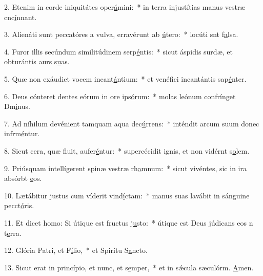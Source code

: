 2. Etenim in corde iniquitátes oper\uline{á}mini:~* in terra injustítias manus vestræ cnc\uline{í}nnant.\par 
3. Alienáti sunt peccatóres a vulva, erravérunt ab \uline{ú}tero:~* locúti snt f\uline{a}lsa.\par 
4. Furor illis secúndum similitúdinem serp\uline{é}ntis:~* sicut áspidis surdæ, et obturántis aurs s\uline{u}as.\par 
5. Quæ non exáudiet vocem incant\uline{á}ntium:~* et venéfici incantántis sap\uline{é}nter.\par 
6. Deus cónteret dentes eórum in ore ips\uline{ó}rum:~* molas leónum confrínget Dm\uline{i}nus.\par 
7. Ad níhilum devénient tamquam aqua dec\uline{ú}rrens:~* inténdit arcum suum donec infrm\uline{é}ntur.\par 
8. Sicut cera, quæ fluit, aufer\uline{é}ntur:~* supercécidit ignis, et non vidérnt s\uline{o}lem.\par 
9. Priúsquam intellígerent spinæ vestræ rh\uline{a}mnum:~* sicut vivéntes, sic in ira absórbt \uline{e}os.\par 
10. Lætábitur justus cum víderit vind\uline{í}ctam:~* manus suas lavábit in sánguine pecct\uline{ó}ris.\par 
11. Et dicet homo: Si útique est fructus j\uline{u}sto:~* útique est Deus júdicans eos n t\uline{e}rra.\par 
12. Glória Patri, et F\uline{í}lio,~* et Spirítu S\uline{a}ncto.\par 
13. Sicut erat in princípio, et nunc, et s\uline{e}mper,~* et in sǽcula sæculórm. \uline{A}men.\par 
